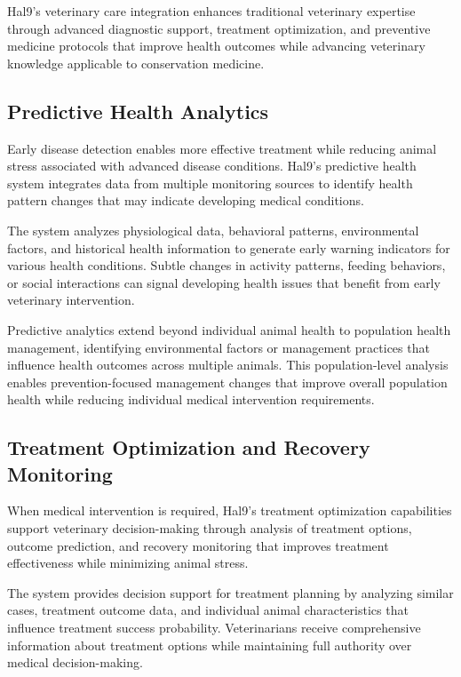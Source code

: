 \documentclass[
  Letterpaper,
]{scrbook}
\begin{document}
Hal9's veterinary care integration enhances traditional veterinary
expertise through advanced diagnostic support, treatment optimization,
and preventive medicine protocols that improve health outcomes while
advancing veterinary knowledge applicable to conservation medicine.

\subsection{Predictive Health
Analytics}\label{predictive-health-analytics}

Early disease detection enables more effective treatment while reducing
animal stress associated with advanced disease conditions. Hal9's
predictive health system integrates data from multiple monitoring
sources to identify health pattern changes that may indicate developing
medical conditions.

The system analyzes physiological data, behavioral patterns,
environmental factors, and historical health information to generate
early warning indicators for various health conditions. Subtle changes
in activity patterns, feeding behaviors, or social interactions can
signal developing health issues that benefit from early veterinary
intervention.

Predictive analytics extend beyond individual animal health to
population health management, identifying environmental factors or
management practices that influence health outcomes across multiple
animals. This population-level analysis enables prevention-focused
management changes that improve overall population health while reducing
individual medical intervention requirements.

\subsection{Treatment Optimization and Recovery
Monitoring}\label{treatment-optimization-and-recovery-monitoring}

When medical intervention is required, Hal9's treatment optimization
capabilities support veterinary decision-making through analysis of
treatment options, outcome prediction, and recovery monitoring that
improves treatment effectiveness while minimizing animal stress.

The system provides decision support for treatment planning by analyzing
similar cases, treatment outcome data, and individual animal
characteristics that influence treatment success probability.
Veterinarians receive comprehensive information about treatment options
while maintaining full authority over medical decision-making.
\end{document}
